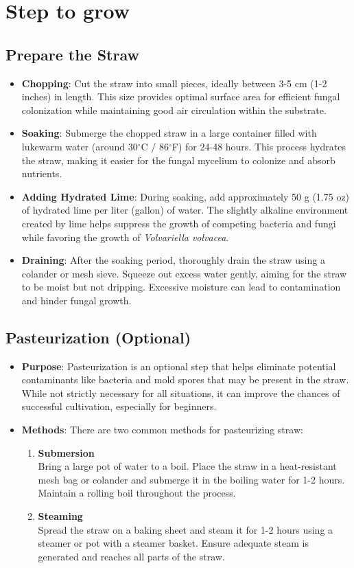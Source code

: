 \section{Step to grow}
\subsection{Prepare the Straw}
\begin{itemize}
    \item \textbf{Chopping}: Cut the straw into small pieces, ideally between 3-5 cm (1-2 inches) in length. This size provides optimal surface area for efficient fungal colonization while maintaining good air circulation within the substrate.
    \item \textbf{Soaking}: Submerge the chopped straw in a large container filled with lukewarm water (around 30$^\circ$C / 86$^\circ$F) for 24-48 hours. This process hydrates the straw, making it easier for the fungal mycelium to colonize and absorb nutrients.
    \item \textbf{Adding Hydrated Lime}: During soaking, add approximately 50 g (1.75 oz) of hydrated lime per liter (gallon) of water. The slightly alkaline environment created by lime helps suppress the growth of competing bacteria and fungi while favoring the growth of \textit{Volvariella volvacea}.
    \item \textbf{Draining}: After the soaking period, thoroughly drain the straw using a colander or mesh sieve. Squeeze out excess water gently, aiming for the straw to be moist but not dripping. Excessive moisture can lead to contamination and hinder fungal growth.
\end{itemize}
\subsection{Pasteurization (Optional)}
\begin{itemize}
    \item \textbf{Purpose}: Pasteurization is an optional step that helps eliminate potential contaminants like bacteria and mold spores that may be present in the straw. While not strictly necessary for all situations, it can improve the chances of successful cultivation, especially for beginners.
    \item \textbf{Methods}: There are two common methods for pasteurizing straw:
    \begin{enumerate}
        \item \textbf{Submersion}\\ Bring a large pot of water to a boil. Place the straw in a heat-resistant mesh bag or colander and submerge it in the boiling water for 1-2 hours. Maintain a rolling boil throughout the process.
        \item \textbf{Steaming}\\ Spread the straw on a baking sheet and steam it for 1-2 hours using a steamer or pot with a steamer basket. Ensure adequate steam is generated and reaches all parts of the straw.
    \end{enumerate}
\end{itemize}
